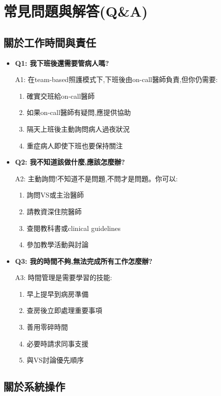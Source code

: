 \documentclass[12pt,a4paper]{article}
\begin{document}
\newpage

\section{常見問題與解答(Q\&A)}

\subsection{關於工作時間與責任}

\begin{itemize}[leftmargin=*]
\item \textbf{Q1: 我下班後還需要管病人嗎?}

A1: 在team-based照護模式下,下班後由on-call醫師負責,但你仍需要:
\begin{enumerate}
\item 確實交班給on-call醫師
\item 如果on-call醫師有疑問,應提供協助
\item 隔天上班後主動詢問病人過夜狀況
\item 重症病人即使下班也要保持關注
\end{enumerate}

\item \textbf{Q2: 我不知道該做什麼,應該怎麼辦?}

A2: 主動詢問!不知道不是問題,不問才是問題。你可以:
\begin{enumerate}
\item 詢問VS或主治醫師
\item 請教資深住院醫師
\item 查閱教科書或clinical guidelines
\item 參加教學活動與討論
\end{enumerate}

\item \textbf{Q3: 我的時間不夠,無法完成所有工作怎麼辦?}

A3: 時間管理是需要學習的技能:
\begin{enumerate}
\item 早上提早到病房準備
\item 查房後立即處理重要事項
\item 善用零碎時間
\item 必要時請求同事支援
\item 與VS討論優先順序
\end{enumerate}
\end{itemize}

\subsection{關於系統操作}
\end{document}
